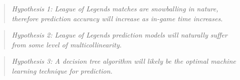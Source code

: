 \begin{quote}  \emph{Hypothesis 1: League of Legends matches are snowballing in nature, therefore prediction accuracy will increase as in-game time increases.} \end{quote}

\begin{quote}  \emph{Hypothesis 2: League of Legends prediction models will naturally suffer from some level of multicollinearity.} \end{quote}

\begin{quote}  \emph{Hypothesis 3: A decision tree algorithm will likely be the optimal machine learning technique for prediction.} \end{quote}